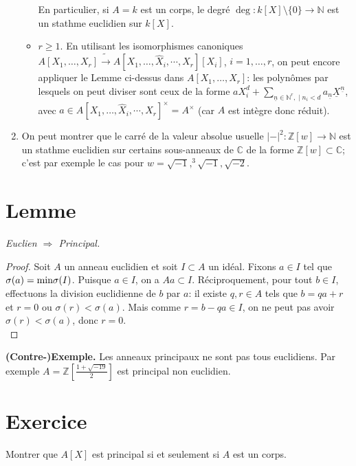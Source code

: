 \documentclass[a4paper, oneside, 12pt]{book}
\theoremstyle{theoremeStyle} %
\theoremstyle{definition} %
\newcommand{\C}{\mathbb{C}}
\newcommand{\Z}{\mathbb{Z}}
\newcommand{\N}{\mathbb{N}}
\begin{document}
\begin{enumerate}[leftmargin=* ,parsep=0cm,itemsep=0cm,topsep=0cm]
\begin{itemize}[leftmargin=* ,parsep=0cm,itemsep=0cm,topsep=0cm]
 En particulier, si $A=k$ est un corps, le degré $\deg:k[X]\setminus\lbrace 0\rbrace\rightarrow \N$  est un stathme euclidien sur $k[X]$.\\

\item $r\geq 1$. En utilisant les isomorphismes canoniques $A[X_1,\dots, X_r]\tilde{\rightarrow} A[X_1,\dots,\hat{X}_i,\cdots , X_r][X_i]$, $i=1,\dots, r$, on peut encore appliquer le Lemme ci-dessus dans $A[X_1,\dots, X_r]$: les polynômes par lesquels on peut diviser sont ceux de la forme $aX_i^{d}+\sum_{\underline{n}\in \N^r,\;|\; n_i<d}a_{\underline{n}}\underline{X}^{\underline{n}}$, avec $a\in A[X_1,\dots,\hat{X}_i,\cdots , X_r]^\times=A^\times$ (car $A$ est intègre donc réduit).\\
\end{itemize}
 \item On peut montrer que le carré de la valeur absolue usuelle  $|-|^2:\Z[w]\rightarrow \N$ est un stathme euclidien sur certains sous-anneaux de $\C$ de la forme $\Z[w]\subset \C$; c'est par exemple le cas pour $w=\sqrt{-1},^3\sqrt{-1},\sqrt{-2}$.
 \end{enumerate}



\section{Lemme}\label{EuclIsPrinc} \textit{Euclien $\Rightarrow$ Principal.}

 \begin{proof} Soit $A$ un anneau euclidien et soit $I\subset A$ un idéal. Fixons $a\in I$ tel que $\sigma(a)=\hbox{\rm min}\sigma(I)$. Puisque $a\in I$, on a $Aa\subset I$. Réciproquement, pour tout $b\in I$, effectuons la division euclidienne de $b$ par $a$: il existe $q,r\in A$ tels que $b=qa+r$ et $r=0$ ou $\sigma(r)<\sigma(a)$. Mais comme $r=b-qa\in I$, on ne peut pas avoir $\sigma(r)<\sigma(a)$, donc $r=0$.\\
 \end{proof}

 \textbf{(Contre-)Exemple.} Les anneaux principaux ne sont pas tous euclidiens. Par exemple  $A=\Z[\frac{1+\sqrt{-19}}{2}]$ est principal non euclidien.\\

 \section{Exercice} Montrer que $A[X]$ est principal si et seulement si $A$ est un corps.
\end{document}
